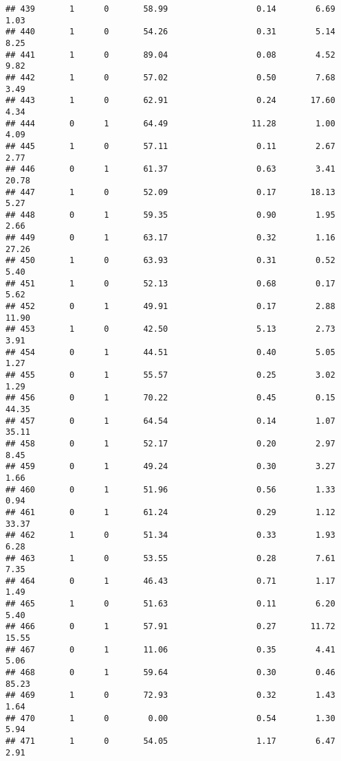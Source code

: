 \documentclass[
]{article}
\begin{document}
\begin{verbatim}
## 439       1      0       58.99                  0.14        6.69        1.03
## 440       1      0       54.26                  0.31        5.14        8.25
## 441       1      0       89.04                  0.08        4.52        9.82
## 442       1      0       57.02                  0.50        7.68        3.49
## 443       1      0       62.91                  0.24       17.60        4.34
## 444       0      1       64.49                 11.28        1.00        4.09
## 445       1      0       57.11                  0.11        2.67        2.77
## 446       0      1       61.37                  0.63        3.41       20.78
## 447       1      0       52.09                  0.17       18.13        5.27
## 448       0      1       59.35                  0.90        1.95        2.66
## 449       0      1       63.17                  0.32        1.16       27.26
## 450       1      0       63.93                  0.31        0.52        5.40
## 451       1      0       52.13                  0.68        0.17        5.62
## 452       0      1       49.91                  0.17        2.88       11.90
## 453       1      0       42.50                  5.13        2.73        3.91
## 454       0      1       44.51                  0.40        5.05        1.27
## 455       0      1       55.57                  0.25        3.02        1.29
## 456       0      1       70.22                  0.45        0.15       44.35
## 457       0      1       64.54                  0.14        1.07       35.11
## 458       0      1       52.17                  0.20        2.97        8.45
## 459       0      1       49.24                  0.30        3.27        1.66
## 460       0      1       51.96                  0.56        1.33        0.94
## 461       0      1       61.24                  0.29        1.12       33.37
## 462       1      0       51.34                  0.33        1.93        6.28
## 463       1      0       53.55                  0.28        7.61        7.35
## 464       0      1       46.43                  0.71        1.17        1.49
## 465       1      0       51.63                  0.11        6.20        5.40
## 466       0      1       57.91                  0.27       11.72       15.55
## 467       0      1       11.06                  0.35        4.41        5.06
## 468       0      1       59.64                  0.30        0.46       85.23
## 469       1      0       72.93                  0.32        1.43        1.64
## 470       1      0        0.00                  0.54        1.30        5.94
## 471       1      0       54.05                  1.17        6.47        2.91

\end{verbatim}
\end{document}
